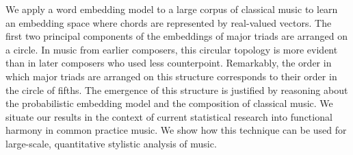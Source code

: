 
We apply a word embedding model to a large corpus of classical music to learn an embedding space where chords are represented by real-valued vectors.
The first two principal components of the embeddings of major triads are arranged on a circle.
In music from earlier composers, this circular topology is more evident than in later composers who used less counterpoint.
Remarkably, the order in which major triads are arranged on this structure corresponds to their order in the circle of fifths.
The emergence of this structure is justified by reasoning about the probabilistic embedding model and the composition of classical music.
We situate our results in the context of current statistical research into functional harmony in common practice music.
We show how this technique can be used for large-scale, quantitative stylistic analysis of music.
